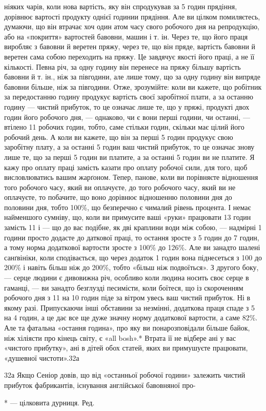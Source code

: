 ніяких чарів, коли нова вартість, яку він спродукував за 5 годин прядіння, дорівнює вартості
продукту однієї годинии прядіння. Але ви цілком помиляєтесь, думаючи, що він втрачає хоч один атом
часу свого робочого дня на репродукцію, або на «покриття» вартостей бавовни, машин і т. ін. Через
те, що його праця виробляє з бавовни й веретен пряжу, через те, що він пряде, вартість бавовни й
веретен сама собою переходить на пряжу.
Це завдячує якості його праці, а не її кількості. Певна річ, за одну годину він перенесе на пряжу
більшу вартість бавовни й т. ін., ніж за півгодини, але лише тому, що за одну годину він випряде
бавовни більше, ніж за півгодини. Отже, зрозумійте: коли ви кажете, що робітник за передостанню
годину продукує вартість своєї заробітної плати, а за останню годину — чистий прибуток, то це
означає лише те, що у пряжі, продукті двох годин його робочого дня, — однаково, чи є вони перші
години, чи останні, — втілено 11 робочих годин, тобто, саме стільки годин, скільки має цілий
його робочий день. А коли ви кажете, що він за перші 5 годин продукує свою заробітну плату, а за
останні 5 годин ваш чистий прибуток, то це означає знову лише те, що за перші 5 годин ви
платите, а за останні 5 годин
ви не платите. Я кажу про оплату праці замість казати про оплату робочої сили, для того, щоб
висловлюватись вашим жарґоном. Тепер, панове, коли ви порівняєте відношення того робочого
часу, який ви оплачуєте, до того робочого часу, який ви не оплачуєте, то побачите, що воно дорівнює
відношенню половини дня до половини дня, тобто 100\%, що безперечно є чималий рівень процента. І
немає найменшого сумніву, що, коли ви примусите ваші «руки» працювати 13 годин замість 11 і — що
до вас подібне, як дві краплини води між собою, — надмірні 1 години просто додасте до даткової
праці, то остання зросте з 5 годин до 7 годин, а тому норма додаткової вартости зросте з
100\% до 126\%. Але ви занадто шалені санґвініки, коли сподівається, що через додаток 1 годин
вона піднесеться з 100 до 200\% і навіть більш ніж до 200\%, тобто «більш ніж подвоїться». З другого
боку, — серце людини є дивовижна річ, особливо коли людина носить своє серце в гаманці, — ви занадто
безглузді песимісти, коли боїтеся, що із скороченням робочого
дня з 11 на 10 годин піде за вітром увесь ваш чистий прибуток. Ні в якому разі. Припускаючи
інші обставини за незмінні,
додаткова праця спаде з 5 на 4 годин, а це дає все ще дуже значну норму додаткової вартости,
а саме 82\%. Але та фатальна «остання година», про яку ви понарозповідали більше байок, ніж
хіліясти про кінець світу, є «all bosh».* Втрата її не відбере ані у вас «чистого прибутку», ані в
дітей обох статей, яких ви примушуєте працювати, «душевної чистоти».32а

32а Якщо Сеніор довів, що від «останньої робочої години» залежить чистий прибуток фабрикантів,
існування англійської бавовняної про-

* — цілковита дурниця. Ред.
